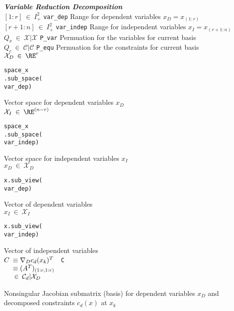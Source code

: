 {\begin{tabbing}
\textbf{\textit{Variable Reduction Decomposition}} \\
$[1:r] \:\in\:I_{+}^{2}$
	\> \texttt{var\_dep}
		\> Range for dependent variables $x_D = x_{(1:r)}$ \\
$[r+1:n] \:\in\:I_{+}^{2}$
	\> \texttt{var\_indep}
		\> Range for independent variables $x_I = x_{(r+1:n)}$ \\
$Q_x \:\in\:\mathcal{X}|\mathcal{X}$
	\>  \texttt{P\_var}
		\> Permuation for the variables for current basis \\
$Q_c \:\in\:\mathcal{C}|\mathcal{C}$
	\>  \texttt{P\_equ}
		\> Permuation for the constraints for current basis \\
$\mathcal{X}_D \:\in\:\RE^r$
	\>  \begin{minipage}[t]{16ex} \texttt{space\_x} \\ \texttt{.sub\_space(} \\ \texttt{var\_dep)} \end{minipage}
		\> Vector space for dependent variables $x_D$ \\
$\mathcal{X}_I \:\in\:\RE^{(n-r)}$
	\>  \begin{minipage}[t]{16ex} \texttt{space\_x} \\ \texttt{.sub\_space(} \\ \texttt{var\_indep)} \end{minipage}
		\> Vector space for independent variables $x_I$ \\
$x_D \:\in\: \mathcal{X}_D$
	\>  \begin{minipage}[t]{16ex} \texttt{x.sub\_view(} \\ \texttt{var\_dep)} \end{minipage}
		\> Vector of dependent variables \\
$x_I \:\in\: \mathcal{X}_I$
	\>  \begin{minipage}[t]{16ex} \texttt{x.sub\_view(} \\ \texttt{var\_indep)} \end{minipage}
		\> Vector of independent variables \\
$C		\begin{array}[t]{l}
			\equiv \nabla_D c_d(x_k)^T \\
			\equiv (A^T)_{(1:r,1:r)} \\
			\:\in\: \mathcal{C}_d|\mathcal{X}_D
		\end{array}$
	\> \texttt{C}
		\> \parbox[t]{50ex}{
				Nonsingular Jacobian submatrix (basis) for dependent variables $x_D$
				and decomposed constraints $c_d(x)$ at $x_k$ } \\

\end{tabbing}}

